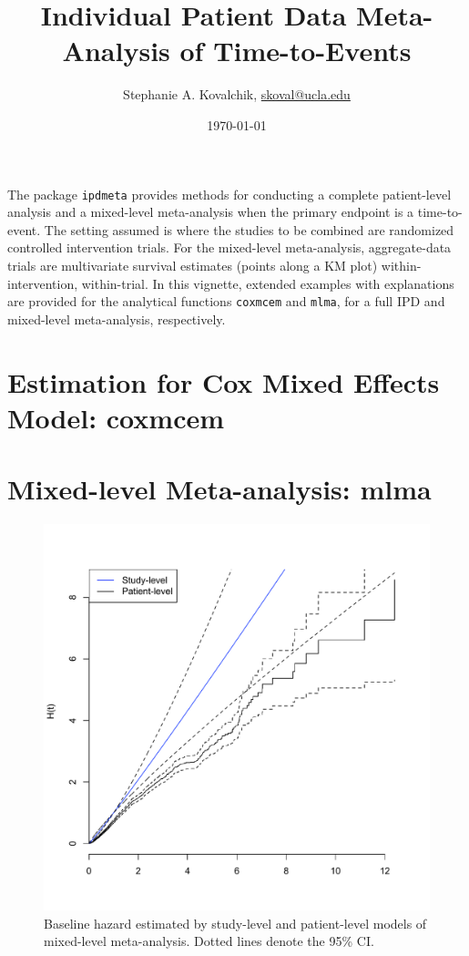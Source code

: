 \documentclass[11pt]{article}
\title{Individual Patient Data Meta-Analysis of Time-to-Events}
\author{Stephanie A. Kovalchik, \url{skoval@ucla.edu}}
\date{\today}
\begin{document}
\maketitle

The package \texttt{ipdmeta} provides methods for conducting a complete
patient-level analysis and a  mixed-level
meta-analysis when the primary endpoint is a time-to-event. The
setting assumed is where the studies to be combined are randomized
controlled intervention trials. For the mixed-level meta-analysis,
aggregate-data trials are multivariate survival estimates (points
along a KM plot) within-intervention, within-trial. In this vignette, extended examples with explanations are
provided for the analytical functions \texttt{coxmcem} and
\texttt{mlma}, for a full IPD and mixed-level meta-analysis, respectively.



\clearpage

\section{Estimation for Cox Mixed Effects Model: coxmcem}



\section{Mixed-level Meta-analysis: mlma}



\clearpage

\begin{figure}\center
\includegraphics{haz.pdf}
\caption{Baseline hazard estimated by study-level and patient-level
  models of mixed-level meta-analysis. Dotted lines denote the 95\% CI.}
\end{figure}
\end{document}
